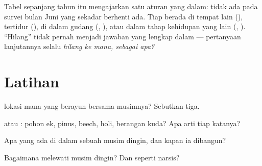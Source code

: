 \begin{remark}\label{rem:g6:life-through-seasons:vanish}
Tabel sepanjang tahun itu mengajarkan satu aturan yang dalam: tidak
ada  pada survei bulan Juni yang sekadar berhenti ada. Tiap
 berada di tempat lain (), tertidur
(), di dalam gudang (, ), atau dalam tahap
kehidupan yang lain (, ). ``Hilang'' tidak pernah
menjadi jawaban yang lengkap dalam  --- pertanyaan lanjutannya
selalu \emph{hilang ke mana, sebagai apa?}
\end{remark}

\section{Latihan}

\begin{exercise}[$\star$]\label{exo:g6:life-through-seasons:1}
 lokasi mana yang berayun bersama musimnya? Sebutkan tiga.
\end{exercise}

\begin{exercise}[$\star$]\label{exo:g6:life-through-seasons:2}
 atau : pohon ek, pinus, beech, holi, berangan
kuda? Apa arti tiap katanya?
\end{exercise}

\begin{exercise}[$\star$]\label{exo:g6:life-through-seasons:3}
Apa yang ada di dalam sebuah  musim dingin, dan kapan ia
dibangun?
\end{exercise}

\begin{exercise}[$\star$]\label{exo:g6:life-through-seasons:4}
Bagaimana  melewati musim dingin? Dan 
seperti  narsis?
\end{exercise}

